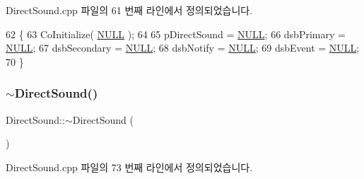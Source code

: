 Direct\+Sound.\+cpp 파일의 61 번째 라인에서 정의되었습니다.


\begin{DoxyCode}
62 \{
63     CoInitialize( \mbox{\hyperlink{getopt1_8c_a070d2ce7b6bb7e5c05602aa8c308d0c4}{NULL}} );
64     
65     pDirectSound  = \mbox{\hyperlink{getopt1_8c_a070d2ce7b6bb7e5c05602aa8c308d0c4}{NULL}};
66     dsbPrimary    = \mbox{\hyperlink{getopt1_8c_a070d2ce7b6bb7e5c05602aa8c308d0c4}{NULL}};
67     dsbSecondary  = \mbox{\hyperlink{getopt1_8c_a070d2ce7b6bb7e5c05602aa8c308d0c4}{NULL}};
68     dsbNotify     = \mbox{\hyperlink{getopt1_8c_a070d2ce7b6bb7e5c05602aa8c308d0c4}{NULL}};
69     dsbEvent      = \mbox{\hyperlink{getopt1_8c_a070d2ce7b6bb7e5c05602aa8c308d0c4}{NULL}};
70 \}
\end{DoxyCode}
\mbox{\label{class_direct_sound_af16e30aa30f5c83d614184010ff3ddc8}} 
\subsubsection{\texorpdfstring{$\sim$\+Direct\+Sound()}{~DirectSound()}}
{\footnotesize\ttfamily Direct\+Sound\+::$\sim$\+Direct\+Sound (\begin{DoxyParamCaption}{ }\end{DoxyParamCaption})\hspace{0.3cm}{\ttfamily [virtual]}}



Direct\+Sound.\+cpp 파일의 73 번째 라인에서 정의되었습니다.


